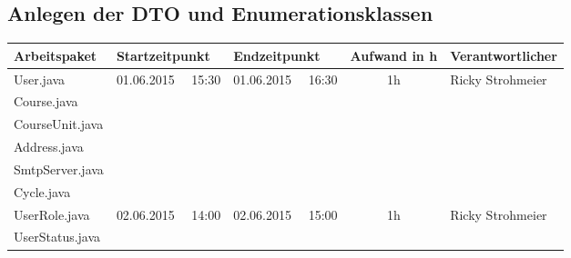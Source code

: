 \begin{landscape}
\subsection{Anlegen der DTO und Enumerationsklassen}
\begin{tabular}{|p{10cm}|p{3.2cm}|p{3.2cm}|c|p{3.5cm}|}
	\hline  \textbf{Arbeitspaket} & \textbf{Startzeitpunkt} & \textbf{Endzeitpunkt} & \textbf{Aufwand in h} & \textbf{Verantwortlicher} \\ 
	\hline   User.java                  & 01.06.2015 \ \ 15:30       & 01.06.2015 \ \ 16:30        & 1h                  & Ricky Strohmeier\\ 
	   Course.java                      &                            &                             &                     &\\ 
	   CourseUnit.java                  &                            &                             &                     &\\ 
	   Address.java                     &                            &                             &                     &\\ 
	   SmtpServer.java                  &                            &                             &                     &\\  
	   Cycle.java                       &                            &                             &                     &\\   
	 \hline UserRole.java               & 02.06.2015 \ \ 14:00       & 02.06.2015 \ \  15:00       &  1h                 & Ricky Strohmeier\\ 
	 UserStatus.java                          &                            &                             &                     &\\ 
	\hline 
\end{tabular} \ \\
\ \\


\end{landscape}
